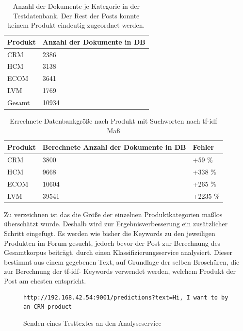 \begin{table}[h!]
\begin{tabular}{ | p{3cm} | l |}
\hline
Produkt & Anzahl der Dokumente in DB \\ \hline
CRM & 2386 \\ \hline
HCM & 3138 \\ \hline
ECOM & 3641 \\ \hline
LVM & 1769 \\ \hline
Gesamt & 10934 \\ \hline
\end{tabular}
\caption{Anzahl der Dokumente je Kategorie in der Testdatenbank. Der Rest der Posts konnte keinem Produkt eindeutig zugeordnet werden.}
\end{table}

\newpage

\begin{table}[h!]
\begin{tabular}{ | p{3cm} | l | l |}
\hline
Produkt & Berechnete Anzahl der Dokumente in DB & Fehler\\ \hline
CRM & 3800 & +59 \%\\ \hline
HCM & 9668 & +338 \% \\ \hline
ECOM & 10604 & +265 \%\\ \hline
LVM & 39541 & +2235 \%\\ \hline
\end{tabular}
\caption{Errechnete Datenbankgröße nach Produkt mit Suchworten nach tf-idf Maß}
\end{table}

Zu verzeichnen ist das die Größe der einzelnen Produktkategorien maßlos überschätzt wurde. Deshalb wird zur Ergebnisverbesserung ein zusätzlicher Schritt eingefügt. Es werden wie bisher die Keywords zu den jeweiligen Produkten im Forum gesucht, jedoch bevor der Post zur Berechnung des Gesamtkorpus beiträgt, durch einen Klassifizierungsservice \cite{n2o} analysiert. Dieser bestimmt aus einem gegebenen Text, auf Grundlage der selben Broschüren, die zur Berechnung der tf-idf- Keywords verwendet werden, welchem Produkt der Post am ehesten entspricht.

\begin{figure}[h!]
\begin{lstlisting}[language=HTML5]
http://192.168.42.54:9001/predictions?text=Hi, I want to by an CRM product
\end{lstlisting}
\caption{Senden eines Testtextes an den Analyseservice}
\end{figure}

